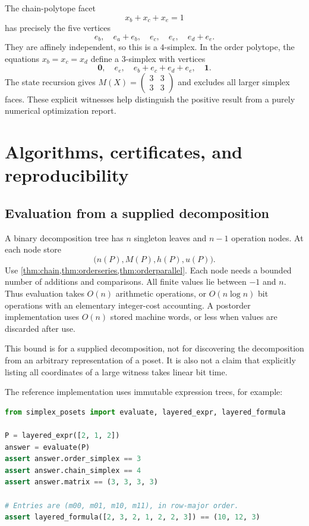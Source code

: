 \documentclass[11pt]{article}
\theoremstyle{definition}
\newcommand{\one}{\mathbf 1}
\newcommand{\zero}{\mathbf 0}
\newcommand{\smat}[4]{\left(\begin{smallmatrix}#1&#2\\#3&#4\end{smallmatrix}\right)}
\begin{document}
The chain-polytope facet
\[
x_b+x_c+x_e=1
\]
has precisely the five vertices
\[
e_b,\quad e_a+e_b,\quad e_c,\quad e_e,\quad e_d+e_e.
\]
They are affinely independent, so this is a $4$-simplex. In the order polytope, the equations $x_b=x_c=x_d$ define a $3$-simplex with vertices
\[
\zero,\quad e_e,\quad e_b+e_c+e_d+e_e,\quad\one.
\]
The state recursion gives $M(X)=\smat{3}{3}{3}{3}$ and excludes all larger simplex faces. These explicit witnesses help distinguish the positive result from a purely numerical optimization report.

\section{Algorithms, certificates, and reproducibility}\label{sec:algorithms}

\subsection{Evaluation from a supplied decomposition}
A binary decomposition tree has $n$ singleton leaves and $n-1$ operation nodes. At each node store
\[
\bigl(n(P),M(P),h(P),u(P)\bigr).
\]
Use \cref{thm:chain,thm:orderseries,thm:orderparallel}. Each node needs a bounded number of additions and comparisons. All finite values lie between $-1$ and $n$. Thus evaluation takes $O(n)$ arithmetic operations, or $O(n\log n)$ bit operations with an elementary integer-cost accounting. A postorder implementation uses $O(n)$ stored machine words, or less when values are discarded after use.

This bound is for a supplied decomposition, not for discovering the decomposition from an arbitrary representation of a poset. It is also not a claim that explicitly listing all coordinates of a large witness takes linear bit time.

The reference implementation uses immutable expression trees, for example:
\par\noindent\begin{minipage}{\linewidth}
\begin{lstlisting}[language=Python]
from simplex_posets import evaluate, layered_expr, layered_formula

P = layered_expr([2, 1, 2])
answer = evaluate(P)
assert answer.order_simplex == 3
assert answer.chain_simplex == 4
assert answer.matrix == (3, 3, 3, 3)

# Entries are (m00, m01, m10, m11), in row-major order.
assert layered_formula([2, 3, 2, 1, 2, 2, 3]) == (10, 12, 3)
\end{lstlisting}
\end{minipage}\par
\end{document}
